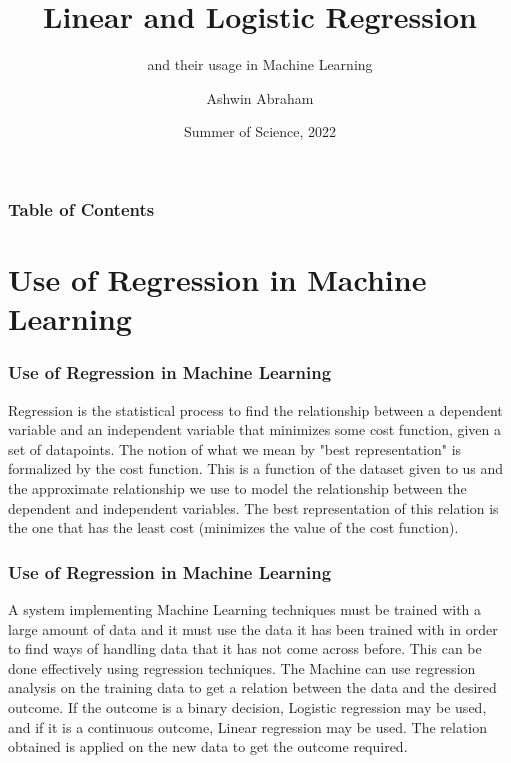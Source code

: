 \documentclass{beamer}
\title[Regression] %
{Linear and Logistic Regression}
\subtitle{and their usage in Machine Learning}
\author[Ashwin Abraham] %
{Ashwin Abraham}
\institute[Summer of Science] %
{
  Mentor:\\
  Garweet Sresth
}
\date[2022] %
{Summer of Science, 2022}
\begin{document}
    \frame{\titlepage}


    \begin{frame}
        \frametitle{Table of Contents}
        \tableofcontents
    \end{frame}


    \section{Use of Regression in Machine Learning}

    \begin{frame}
        \frametitle{Use of Regression in Machine Learning}
        Regression is the statistical process to find the relationship between a dependent variable and an independent variable that minimizes some 
        cost function, given a set of datapoints. The notion of what we mean by "best representation" is formalized by the cost function. This is a function of the dataset given to us and the 
        approximate relationship we use to model the relationship between the dependent and independent variables. The best representation of this 
        relation is the one that has the least cost (minimizes the value of the cost function).
    \end{frame}

    \begin{frame}
        \frametitle{Use of Regression in Machine Learning}
        A system implementing Machine Learning techniques must be trained with a large amount of data and it must use the data it has been trained with 
        in order to find ways of handling data that it has not come across before. This can be done effectively using regression techniques. The Machine 
        can use regression analysis on the training data to get a relation between the data and the desired outcome. If the outcome is a binary decision, 
        Logistic regression may be used, and if it is a continuous outcome, Linear regression may be used. The relation obtained is applied on the new data 
        to get the outcome required.
    \end{frame}

\end{document}
